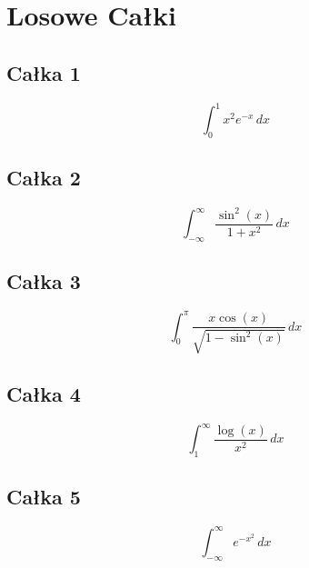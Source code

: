 \documentclass{article}
\begin{document}
\section*{Losowe Całki}

\subsection*{Całka 1}
\begin{equation}
    \int_{0}^{1} x^2 e^{-x} \,dx
\end{equation}

\subsection*{Całka 2}
\begin{equation}
    \int_{-\infty}^{\infty} \frac{\sin^2(x)}{1+x^2} \,dx
\end{equation}

\subsection*{Całka 3}
\begin{equation}
    \int_{0}^{\pi} \frac{x \cos(x)}{\sqrt{1 - \sin^2(x)}} \,dx
\end{equation}

\subsection*{Całka 4}
\begin{equation}
    \int_{1}^{\infty} \frac{\log(x)}{x^2} \,dx
\end{equation}

\subsection*{Całka 5}
\begin{equation}
    \int_{-\infty}^{\infty} e^{-x^2} \,dx
\end{equation}
\end{document}
